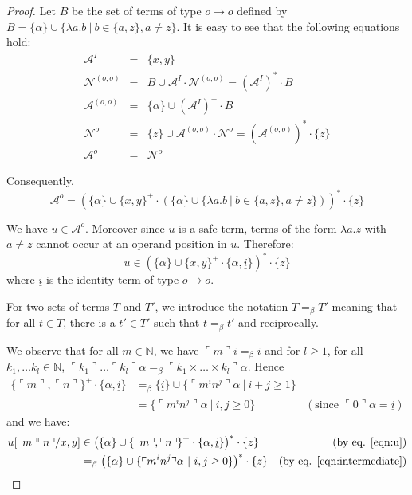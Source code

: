\documentclass{article}
\newcommand{\encode}[1]{\ulcorner #1 \urcorner}
\newcommand{\nat}{\mathbb{N}}
\newcommand{\union}{\cup}
\begin{document}
\begin{proof}
Let $B$ be the set of terms of type $o\rightarrow o$ defined by $B = \{ \alpha \} \union \{ \lambda a.b \ | \ b \in \{a,z\}, a \neq z \}$.
It is easy to see that the following equations hold:
\begin{eqnarray*}
\mathcal{A}^I &=& \{ x,y \} \\
\mathcal{N}^{(o,o)} &=& B \union \mathcal{A}^I \cdot
\mathcal{N}^{(o,o)} = (\mathcal{A}^I)^* \cdot B \\
\mathcal{A}^{(o,o)} &=& \{ \alpha \} \union (\mathcal{A}^I)^+ \cdot B \\
\mathcal{N}^o &=& \{ z \} \union \mathcal{A}^{(o,o)} \cdot \mathcal{N}^o = (\mathcal{A}^{(o,o)})^* \cdot \{ z \} \\
\mathcal{A}^o &=& \mathcal{N}^{o}
\end{eqnarray*}

Consequently, $$\mathcal{A}^o = \left( \{\alpha \} \union \{x,y\}^+ \cdot \left( \{\alpha \} \union \{\lambda a.b \ | \ b \in \{a,z\}, a \neq z \} \right) \right)^* \cdot \{ z \}$$

We have $u \in \mathcal{A}^o$. Moreover since $u$ is a safe term,
terms of the form $\lambda a . z$ with $a \neq z$ cannot occur at an
operand position in $u$. Therefore:
\begin{equation}
u \in \left( \{\alpha\} \union \{x,y\}^+ \cdot \{\alpha,
\underline{i} \} \right)^* \cdot \{ z \} \label{eqn:u}
\end{equation}
where $\underline{i}$ is the identity term of type $o\rightarrow o$.

For two sets of terms $T$ and $T'$, we introduce the notation $T =_\beta T'$ meaning that for all $t \in T$, there is a $t' \in T'$ such that $t =_\beta t'$ and reciprocally.

We observe that for all $m \in \nat$, we have $\encode{m} \underline{i} =_\beta \underline{i}$ and for $l\geq 1$, for all $k_1, \ldots k_l \in \nat$, 
$\encode{k_1}\ldots \encode{k_l} \alpha =_\beta
\encode{k_1\times \ldots \times k_l} \alpha$. Hence
\begin{align}
\{\encode{m},\encode{n}\}^+ \cdot \{\alpha, \underline{i} \} &=_\beta
\{ \underline{i} \} \union
\{ \encode{m^i n^j} \alpha \ |\ i+j \geq 1 \} \nonumber \\
&= \{ \encode{m^i n^j} \alpha \ |\ i,j \geq 0 \} & ( \mbox{since } \encode{0} \alpha = \underline{i}) \label{eqn:intermediate}
\end{align}
and we have:
\begin{align*}
u[\encode{m} \encode{n}/x,y] &\in \left( \{ \alpha \} \union \{\encode{m},\encode{n}\}^+ \cdot \{\alpha, \underline{i} \} \right)^* \cdot \{ z \}  & \mbox{(by eq. \ref{eqn:u})} \\
&=_\beta \left( \{\alpha \} \union \{ \encode{m^i n^j}
\alpha \ | \ i,j \geq 0 \} \right)^* \cdot \{ z \} & \mbox{(by eq. \ref{eqn:intermediate})} 
\end{align*} 


\end{proof}
\end{document}
